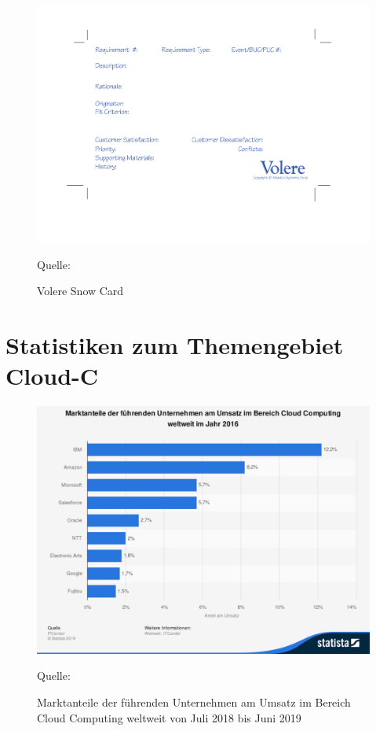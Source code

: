\begin{figure}[H]
	\centering
	\includegraphics[scale=0.6]{img/snowcard.pdf}
	\caption{Volere Snow Card}
	{\footnotesize Quelle: \cite{VolereSnowCard}}
	\label{abb:volereSnowCard}
\end{figure}

\section{Statistiken zum Themengebiet \ac{Cloud-C}}

\begin{figure}[H]
	\centering
	\includegraphics[scale=0.43]{img/statistic_id150979_marktanteile-der-fuehrenden-unternehmen-im-bereich-cloud-computing-weltweit-2019.pdf}
	\caption{Marktanteile der führenden Unternehmen am Umsatz im Bereich Cloud Computing weltweit von Juli 2018 bis Juni 2019}
	{\footnotesize Quelle: \cite{itcandor_cloud_2019}}
	\label{abb:marktanteileCC19}
\end{figure}

